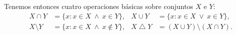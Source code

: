 Tenemos entonces cuatro operaciones básicas sobre conjuntos $X$ e $Y$:
\[
    \begin{aligned}
        X \cap Y      & = \{x : x \in X \ \wedge \ x \in Y\},    & X \cup Y                           & = \{x : x \in X \ \vee \ x \in Y\}, \\
        X \setminus Y & = \{x : x \in X \ \wedge \ x \notin Y\},
                      & X \mathbin{\triangle} Y                  & = (X \cup Y) \setminus (X \cap Y).
    \end{aligned}
\]
